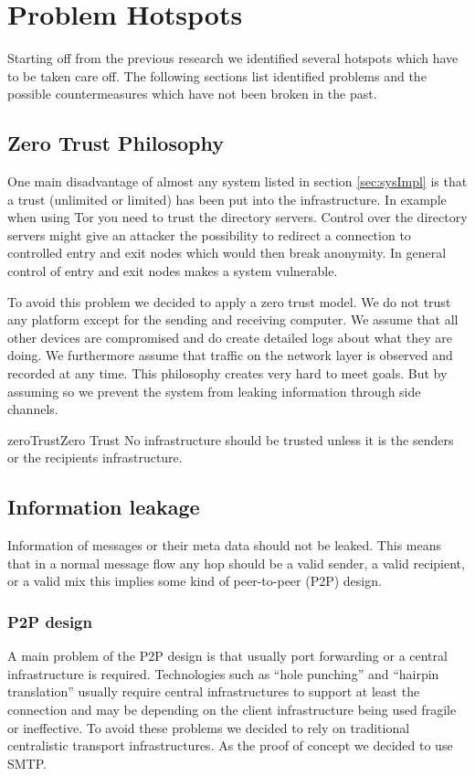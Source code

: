 \section{Problem Hotspots}
Starting off from the previous research we identified several hotspots which have to be taken care off. The following sections list identified problems and the possible countermeasures which have not been broken in the past.


\subsection{Zero Trust Philosophy}
One main disadvantage of almost any system listed in section \ref{sec:sysImpl} is that a trust (unlimited or limited) has been put into the infrastructure. In example when using Tor you need to trust the directory servers. Control over the directory servers might give an attacker the possibility to redirect a connection to controlled entry and exit nodes which would then break anonymity. In general control of entry and exit nodes makes a system vulnerable. 

To avoid this problem we decided to apply a zero trust model. We do not trust any platform except for the sending and receiving computer. We assume that all other devices are compromised and do create detailed logs about what they are doing. We furthermore assume that traffic on the network layer is observed and recorded at any time. This philosophy creates very hard to meet goals. But by assuming so we prevent the system from leaking information through side channels.

\begin{requirement}{zeroTrust}{Zero Trust}
	No infrastructure should be trusted unless it is the senders or the recipients infrastructure.
\end{requirement}	

\subsection{Information leakage}
Information of messages or their meta data should not be leaked. This means that in a normal message flow any hop should be a valid sender, a valid recipient, or a valid mix this implies some kind of peer-to-peer (P2P) design. 

\subsubsection{P2P design}
A main problem of the P2P design is that usually port forwarding or a central infrastructure is required. Technologies such as ``hole punching'' and ``hairpin translation'' usually require central infrastructures to support at least the connection and may be depending on the client infrastructure being used fragile or ineffective. To avoid these problems we decided to rely on traditional centralistic transport infrastructures. As the proof of concept we decided to use SMTP. 

